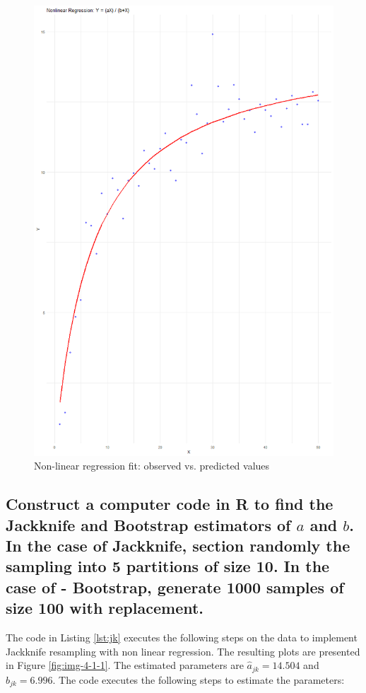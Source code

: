 \documentclass[]{article}
\begin{document}
\begin{figure}[H]
	\centering
	\includegraphics[width=0.7\linewidth]{img/img-4-1}
	\caption{Non-linear regression fit: observed vs. predicted values}
	\label{fig:img-4-1}
\end{figure}


\subsection{Construct a computer code in R to find the Jackknife and Bootstrap estimators of $a$ and $b$. In the case of Jackknife, section randomly the sampling into 5 partitions of size 10. In the case of -
	Bootstrap, generate 1000 samples of size 100 with replacement. }



The code in Listing \ref{lst:jk} executes the following steps on the data to implement Jackknife resampling with non linear regression. The resulting plots are presented in Figure \ref{fig:img-4-1-1}. The estimated parameters are $\hat{a}_{jk} = 14.504$ and $\hat{b}_{jk} = 6.996$. The code executes the following steps to estimate the parameters:
\end{document}
